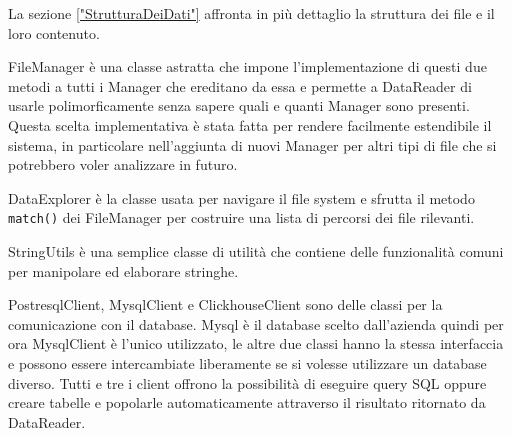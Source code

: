 La sezione \ref{"StrutturaDeiDati"} affronta in più dettaglio la struttura dei file e il loro contenuto.

FileManager è una classe astratta che impone l'implementazione di questi due metodi a tutti i Manager che ereditano da essa e permette a DataReader di usarle polimorficamente senza sapere quali e quanti Manager sono presenti. Questa scelta implementativa è stata fatta per rendere facilmente estendibile il sistema, in particolare nell'aggiunta di nuovi Manager per altri tipi di file che si potrebbero voler analizzare in futuro.

DataExplorer è la classe usata per navigare il file system e sfrutta il metodo \texttt{match()} dei FileManager per costruire una lista di percorsi dei file rilevanti.

StringUtils è una semplice classe di utilità che contiene delle funzionalità comuni per manipolare ed elaborare stringhe.

PostresqlClient, MysqlClient e ClickhouseClient sono delle classi per la comunicazione con il database. Mysql è il database scelto dall'azienda quindi per ora MysqlClient è l'unico utilizzato, le altre due classi hanno la stessa interfaccia e possono essere intercambiate liberamente se si volesse utilizzare un database diverso.
Tutti e tre i client offrono la possibilità di eseguire query SQL oppure creare tabelle e popolarle automaticamente attraverso il risultato ritornato da DataReader.


